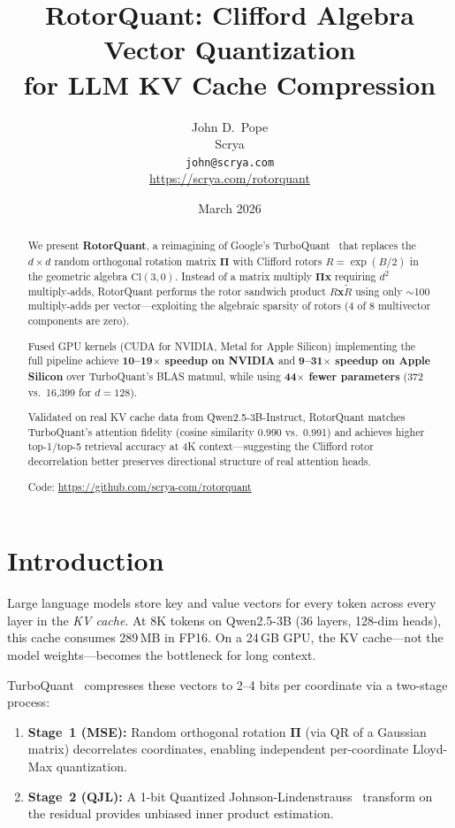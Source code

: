 \documentclass[10pt,twocolumn]{article}
\title{\textbf{RotorQuant: Clifford Algebra Vector Quantization\\for LLM KV Cache Compression}}
\author{
  John D.\ Pope\\
  Scrya\\
  \texttt{john@scrya.com}\\
  \url{https://scrya.com/rotorquant}
}
\date{March 2026}
\begin{document}
\maketitle

\begin{abstract}
We present \textbf{RotorQuant}, a reimagining of Google's TurboQuant~\cite{turboquant} that replaces the $d \times d$ random orthogonal rotation matrix $\mathbf{\Pi}$ with Clifford rotors $R = \exp(B/2)$ in the geometric algebra $\mathrm{Cl}(3,0)$.
Instead of a matrix multiply $\mathbf{\Pi x}$ requiring $d^2$ multiply-adds, RotorQuant performs the rotor sandwich product $R\mathbf{x}\tilde{R}$ using only $\sim$100 multiply-adds per vector---exploiting the algebraic sparsity of rotors (4 of 8 multivector components are zero).

Fused GPU kernels (CUDA for NVIDIA, Metal for Apple Silicon) implementing the full pipeline achieve \textbf{10--19$\times$ speedup on NVIDIA} and \textbf{9--31$\times$ speedup on Apple Silicon} over TurboQuant's BLAS matmul, while using \textbf{44$\times$ fewer parameters} (372 vs.\ 16,399 for $d=128$).

Validated on real KV cache data from Qwen2.5-3B-Instruct, RotorQuant matches TurboQuant's attention fidelity (cosine similarity 0.990 vs.\ 0.991) and achieves higher top-1/top-5 retrieval accuracy at 4K context---suggesting the Clifford rotor decorrelation better preserves directional structure of real attention heads.

Code: \url{https://github.com/scrya-com/rotorquant}
\end{abstract}

\section{Introduction}
\label{sec:intro}

Large language models store key and value vectors for every token across every layer in the \emph{KV cache}.
At 8K tokens on Qwen2.5-3B (36 layers, 128-dim heads), this cache consumes 289\,MB in FP16.
On a 24\,GB GPU, the KV cache---not the model weights---becomes the bottleneck for long context.

TurboQuant~\cite{turboquant} compresses these vectors to 2--4 bits per coordinate via a two-stage process:
\begin{enumerate}[nosep]
  \item \textbf{Stage~1 (MSE):} Random orthogonal rotation $\mathbf{\Pi}$ (via QR of a Gaussian matrix) decorrelates coordinates, enabling independent per-coordinate Lloyd-Max quantization.
  \item \textbf{Stage~2 (QJL):} A 1-bit Quantized Johnson-Lindenstrauss~\cite{qjl} transform on the residual provides unbiased inner product estimation.
\end{enumerate}
\end{document}
